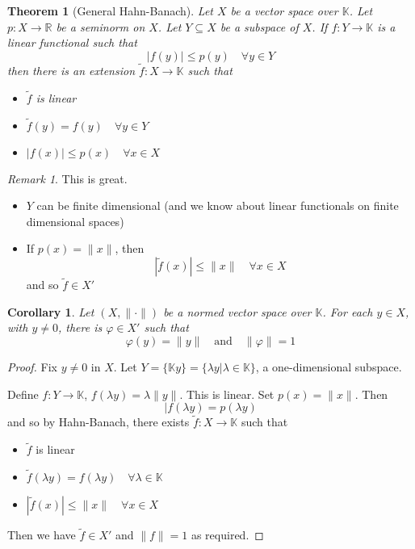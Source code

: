 \documentclass[10pt, oneside, reqno]{amsart}
\theoremstyle{plain}%
\newtheorem{thm}{Theorem}[section]
\newtheorem*{cor}{Corollary}
\theoremstyle{definition}
\theoremstyle{remark}
\newtheorem*{rem}{Remark}
\newcommand{\R}{\mathbb{R}}
\newcommand{\K}{\mathbb{K}}
\renewcommand{\phi}{\varphi}
\begin{document}
\begin{thm}[General Hahn-Banach]
    Let $X$ be a vector space over $\K$.  Let $p: X \rightarrow \R$ be a seminorm on $X$.  Let $Y \subseteq X$ be a subspace of $X$.  If $f : Y \rightarrow \K$ is a linear functional such that \[
        | f(y) | \leq p(y) \quad \forall y \in Y
    \] then there is an extension $\tilde{f} : X \rightarrow \K$ such that 
    \begin{itemize}
        \item $\tilde{f}$ is linear
        \item $\tilde f (y) = f(y) \quad \forall y \in Y$
        \item $|f(x)| \leq p(x) \quad \forall x \in X$
    \end{itemize}
\end{thm}

\begin{rem}
    This is great.
    \begin{itemize}
        \item $Y$ can be finite dimensional (and we know about linear functionals on finite dimensional spaces)
        \item If $p(x) = \| x \|$, then \[
            |\tilde f (x) | \leq \|x \| \quad \forall x \in X
        \] and so $\tilde f \in X'$
    \end{itemize}
\end{rem}

\begin{cor}
    Let $(X, \| \cdot \|)$ be a normed vector space over $\K$.  For each $y \in X$, with $y \neq 0$, there is $\phi \in X'$ such that \[
        \phi(y) = \| y \| \quad \text{and} \quad \| \phi \| = 1
    \]
\end{cor}
\begin{proof}
    Fix $y \neq 0$ in $X$.  Let $Y = \{ \K y \} = \{ \lambda y | \lambda \in \K \}$, a one-dimensional subspace.  
    
    Define $f : Y \rightarrow \K$, $f( \lambda y) = \lambda \| y \|$.  This is linear.  Set $p(x) = \| x \|$.  Then \[
        | f(\lambda y ) = p(\lambda y)
    \] and so by Hahn-Banach, there exists $\tilde f : X \rightarrow \K$ such that
    \begin{itemize}
        \item $\tilde f$ is linear
        \item $\tilde f(\lambda y) = f( \lambda y) \quad \forall \lambda \in \K$
        \item $| \tilde f (x) | \leq \| x \| \quad \forall x \in X$
    \end{itemize}
    Then we  have $\tilde f \in X'$ and $\| f \| = 1$ as required.
\end{proof}
\end{document}
